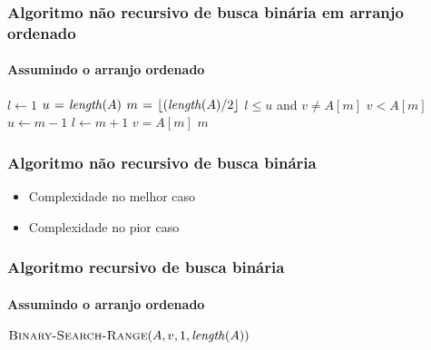 \documentclass{beamer}
\begin{document}
\begin{frame}
  \frametitle{Algoritmo não recursivo de busca binária em arranjo ordenado}
  \framesubtitle{Assumindo o arranjo ordenado}

\begin{small}
\begin{codebox}
\zi \Comment {}
\li $l \gets 1$
\li $u \gets \id{length}(A)$
\li $m \gets \lfloor (\id{length}(A)/2 \rfloor$
\li \While $l \le u$ and $v \neq A[m]$
\li \Do
       \If $v < A[m]$
\li    \Then
         $u \gets m-1$
\li    \Else
         $l \gets m+1$
       \End
{} 
    \End
\li \If $v = A[m]$
\li \Then
      \Return $m$
\li \Else
      \Return {}
    \End
\zi \Comment {}
\end{codebox}  
\end{small}
\end{frame}

\begin{frame}
  \frametitle{Algoritmo não recursivo de busca binária}

\begin{itemize}

  \item Complexidade no melhor caso

  \item Complexidade no pior caso

\end{itemize}

\end{frame}

\begin{frame}
  \frametitle{Algoritmo recursivo de busca binária}
  \framesubtitle{Assumindo o arranjo ordenado}

\begin{codebox}
\zi \Comment {}
\li \Return $\proc{Binary-Search-Range}(A, v, 1, \id{length}(A))$
\zi \Comment {}
\end{codebox}  

\end{frame}
\end{document}

